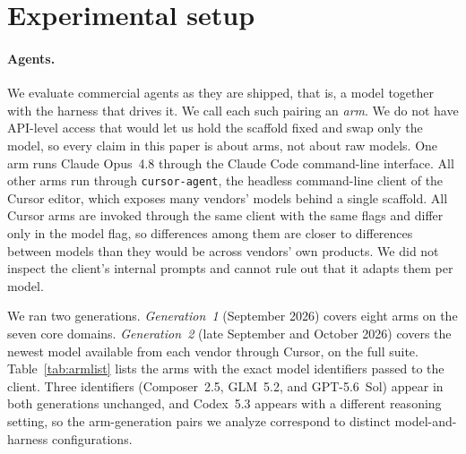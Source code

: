 \section{Experimental setup}
\label{sec:setup}

\paragraph{Agents.} We evaluate commercial agents as they are shipped, that is,
a model together with the harness that drives it. We call each such pairing an
\emph{arm}. We do not have API-level access that would let us hold the
scaffold fixed and swap only the model, so every claim in this paper is about
arms, not about raw models. One arm runs Claude Opus~4.8 through the Claude
Code command-line interface. All other arms run through \texttt{cursor-agent},
the headless command-line client of the Cursor editor, which exposes many
vendors' models behind a single scaffold. All Cursor arms are invoked through the same client
with the same flags and differ only in the model flag, so differences among
them are closer to differences between models than they would be across
vendors' own products. We did not inspect the client's internal prompts and
cannot rule out that it adapts them per model.

We ran two generations. \emph{Generation~1} (September 2026) covers eight arms
on the seven core domains. \emph{Generation~2} (late September and October
2026) covers the newest model available from each vendor through Cursor, on
the full suite. Table~\ref{tab:armlist} lists the arms with the exact model
identifiers passed to the client. Three identifiers (Composer~2.5, GLM~5.2,
and GPT-5.6~Sol) appear in both generations unchanged, and Codex~5.3 appears
with a different reasoning setting, so the \NArms{} arm-generation pairs we
analyze correspond to \NConfigsDistinct{} distinct model-and-harness
configurations.

